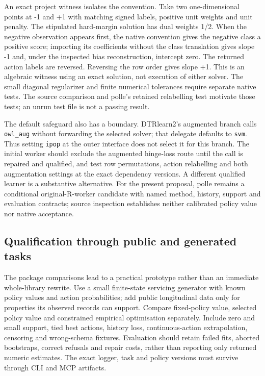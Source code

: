 An exact project witness isolates the convention. Take two one-dimensional
points at -1 and +1 with matching signed labels, positive unit weights and
unit penalty. The stipulated hard-margin solution has dual weights 1/2.
When the negative observation appears first, the native convention gives
the negative class a positive score; importing its coefficients without
the class translation gives slope -1 and, under the inspected bias
reconstruction, intercept zero. The returned action labels are reversed.
Reversing the row order gives slope +1. This is an algebraic witness using
an exact solution, not execution of either solver. The small diagonal
regularizer and finite numerical tolerances require separate native tests.
The source comparison and polle's retained relabelling test motivate those
tests; an unrun test file is not a passing result.
\citep{rel15policydelegates,rel15delegatewitnesses}

The default safeguard also has a boundary. DTRlearn2's augmented branch
calls \texttt{owl\_aug} without forwarding the selected solver; that
delegate defaults to \texttt{svm}. Thus setting \texttt{ipop} at the outer
interface does not select it for this branch. The initial worker should
exclude the augmented hinge-loss route until the call is repaired and
qualified, and test row permutations, action relabelling and both
augmentation settings at the exact dependency versions. A different
qualified learner is a substantive alternative. For the present proposal,
polle remains a conditional original-R-worker candidate with named method,
history, support and evaluation contracts; source inspection establishes
neither calibrated policy value nor native acceptance.
\citep{exec24_policiesr_polle,rel15policydelegates}

\subsection{Qualification through public and generated tasks}
The package comparisons lead to a practical prototype rather than an immediate
whole-library rewrite. Use a small finite-state servicing generator with known
policy values and action probabilities; add public longitudinal data only for
properties its observed records can support. Compare fixed-policy value, selected
policy value and constrained empirical optimisation separately. Include zero and
small support, tied best actions, history loss, continuous-action extrapolation,
censoring and wrong-schema fixtures. Evaluation should retain failed fits,
aborted bootstraps, correct refusals and repair costs, rather than reporting only
returned numeric estimates. The exact logger, task and policy versions must survive
through CLI and MCP artifacts.

